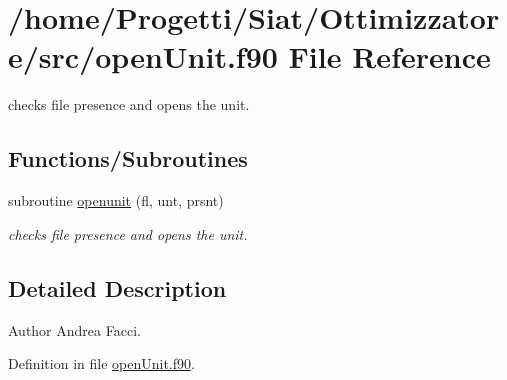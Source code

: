 \hypertarget{open_unit_8f90}{\section{/home/\-Progetti/\-Siat/\-Ottimizzatore/src/open\-Unit.f90 File Reference}
\label{open_unit_8f90}
}


checks file presence and opens the unit.  


\subsection*{Functions/\-Subroutines}
\begin{DoxyCompactItemize}
\item 
subroutine \hyperlink{open_unit_8f90_abaa0a5d0ffc5b96b5d090ddb8f7be6ad}{openunit} (fl, unt, prsnt)
\begin{DoxyCompactList}\small\item\em checks file presence and opens the unit. \end{DoxyCompactList}\end{DoxyCompactItemize}


\subsection{Detailed Description}
\begin{DoxyAuthor}{Author}
Andrea Facci. 
\end{DoxyAuthor}


Definition in file \hyperlink{open_unit_8f90_source}{open\-Unit.\-f90}.



